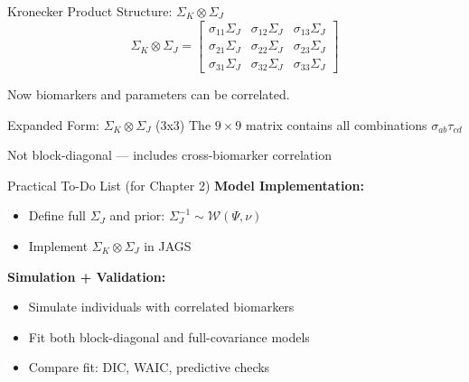 \documentclass[
  ignorenonframetext,
]{beamer}
\providecommand{\tightlist}{%
  \setlength{\itemsep}{0pt}\setlength{\parskip}{0pt}}\usepackage{longtable,booktabs,array}
\begin{document}
\begin{frame}{Kronecker Product Structure:
\(\Sigma_K \otimes \Sigma_J\)}
\label{kronecker-product-structure-sigma_k-otimes-sigma_j}
\[
\Sigma_K \otimes \Sigma_J =
\begin{bmatrix}
\sigma_{11}\Sigma_J & \sigma_{12}\Sigma_J & \sigma_{13}\Sigma_J \\
\sigma_{21}\Sigma_J & \sigma_{22}\Sigma_J & \sigma_{23}\Sigma_J \\
\sigma_{31}\Sigma_J & \sigma_{32}\Sigma_J & \sigma_{33}\Sigma_J
\end{bmatrix}
\]

Now biomarkers and parameters can be correlated.
\end{frame}

\begin{frame}{Expanded Form: \(\Sigma_K \otimes \Sigma_J\) (3x3)}
\label{expanded-form-sigma_k-otimes-sigma_j-3x3}
The \(9 \times 9\) matrix contains all combinations
\(\sigma_{ab}\tau_{cd}\)

Not block-diagonal --- includes cross-biomarker correlation
\end{frame}

\begin{frame}{Practical To-Do List (for Chapter 2)}
\label{practical-to-do-list-for-chapter-2}
\textbf{Model Implementation:}

\begin{itemize}
\tightlist
\item
  Define full \(\Sigma_J\) and prior:
  \(\Sigma_J^{-1} \sim \mathcal{W}(\Psi, \nu)\)\\
\item
  Implement \(\Sigma_K \otimes \Sigma_J\) in JAGS
\end{itemize}

\textbf{Simulation + Validation:}

\begin{itemize}
\tightlist
\item
  Simulate individuals with correlated biomarkers\\
\item
  Fit both block-diagonal and full-covariance models\\
\item
  Compare fit: DIC, WAIC, predictive checks
\end{itemize}
\end{frame}
\end{document}
